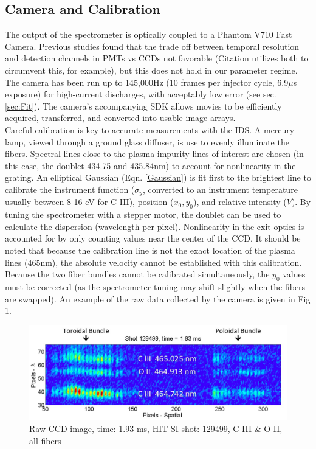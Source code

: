 \documentclass{AIAA}
\begin{document}
\subsection{Camera and Calibration}
\hspace*{4ex}The output of the spectrometer is optically coupled to a Phantom V710 Fast Camera. Previous studies found that the trade off between temporal resolution and detection channels in PMTs vs  CCDs not favorable (Citation \cite{bamford1992combination} utilizes both to circumvent this, for example), but this does not hold in our parameter regime. The camera has been run up to 145,000Hz (10 frames per injector cycle, 6.9$\mu$s exposure) for high-current discharges, with acceptably low error (see sec. \ref{sec:Fit}). The camera's accompanying SDK allows movies to be efficiently acquired, transferred, and converted into usable image arrays. \\
\hspace*{4ex}Careful calibration is key to accurate measurements with the IDS. A mercury lamp, viewed through a ground glass diffuser, is use to evenly illuminate the fibers. Spectral lines close to the plasma impurity lines of interest are chosen (in this case, the doublet 434.75 and 435.84nm) to account for nonlinearity in the grating. An elliptical Gaussian (Eqn. \ref{Gaussian}) is fit first to the brightest line to calibrate the instrument function ($\sigma_y$, converted to an instrument temperature usually between 8-16 eV for C-III), position ($x_0,y_0$), and relative intensity ($V$). By tuning the spectrometer with a stepper motor, the doublet can be used to calculate the dispersion (wavelength-per-pixel). Nonlinearity in the exit optics is accounted for by only counting values near the center of the CCD.  It should be noted that because the calibration line is not the exact location of the plasma lines (465nm), the absolute velocity cannot be established with this calibration. Because the two fiber bundles cannot be calibrated simultaneously, the $y_0$ values must be corrected (as the spectrometer tuning may shift slightly when the fibers are swapped). An example of the raw data collected by the camera is given in Fig \ref{HITSI_CCD}.
\begin{center}
\begin{figure}
\includegraphics[width=5in]{HITSI_CCD.jpg}
\caption{Raw CCD image, time: 1.93 ms, HIT-SI shot: 129499, C III \& O II, all fibers}\label{HITSI_CCD}
\end{figure}
\end{center}
\end{document}
